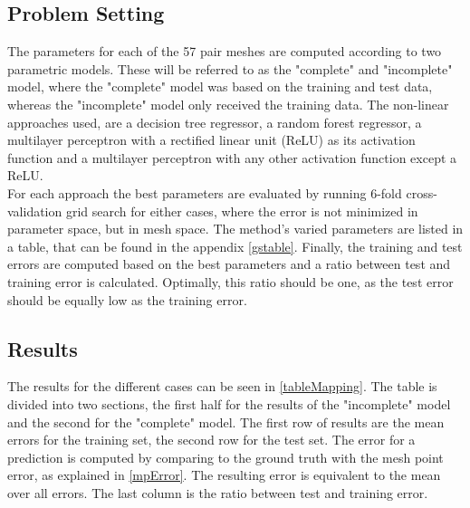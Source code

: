 \subsection{Problem Setting}
The parameters for each of the 57 pair meshes are computed according to two parametric models. These will be referred to as the "complete" and "incomplete" model, where the "complete" model was based on the training and test data, whereas the "incomplete" model only received the training data. The non-linear approaches used, are a decision tree regressor, a random forest regressor, a multilayer perceptron with a rectified linear unit (ReLU) as its activation function and a multilayer perceptron with any other activation function except a ReLU. \\
For each approach the best parameters are evaluated by running 6-fold cross-validation grid search for either cases, where the error is not minimized in parameter space, but in mesh space. The method's varied parameters are listed in a table, that can be found in the appendix \ref{gstable}. Finally, the training and test errors are computed based on the best parameters and a ratio between test and training error is calculated. Optimally, this ratio should be one, as the test error should be equally low as the training error.

\subsection{Results}
The results for the different cases can be seen in \ref{tableMapping}. The table is divided into two sections, the first half for the results of the "incomplete" model and the second for the "complete" model. The first row of results are the mean errors for the training set, the second row for the test set. The error for a prediction is computed by comparing to the ground truth with the mesh point error, as explained in \ref{mpError}. The resulting error is equivalent to the mean over all errors. The last column is the ratio between test and training error.

